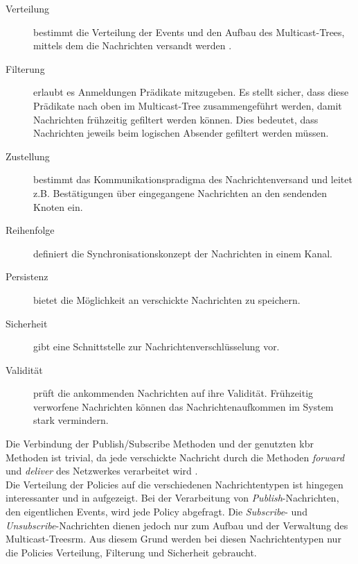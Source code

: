 \begin{description}
\item[Verteilung] bestimmt die Verteilung der Events und den Aufbau des Multicast-Trees, mittels dem die Nachrichten versandt werden \cite{KostasKatrinis2005}.
\item[Filterung] erlaubt es Anmeldungen Prädikate mitzugeben. Es stellt sicher, dass diese Prädikate nach oben im Multicast-Tree zusammengeführt werden, damit Nachrichten frühzeitig gefiltert werden können. Dies bedeutet, dass Nachrichten jeweils beim logischen Absender gefiltert werden müssen.
\item[Zustellung] bestimmt das Kommunikationspradigma des Nachrichtenversand und leitet z.B. Bestätigungen über eingegangene Nachrichten an den sendenden Knoten ein.
\item[Reihenfolge] definiert die Synchronisationskonzept der Nachrichten in einem Kanal.
\item[Persistenz] bietet die Möglichkeit an verschickte Nachrichten zu speichern.
\item[Sicherheit] gibt eine Schnittstelle zur Nachrichtenverschlüsselung vor.
\item[Validität] prüft die ankommenden Nachrichten auf ihre Validität. Frühzeitig verworfene Nachrichten können das Nachrichtenaufkommen im System stark vermindern.
\end{description}

Die Verbindung der Publish/Subscribe Methoden und der genutzten \ac{kbr} Methoden ist trivial, da jede verschickte Nachricht durch die Methoden \emph{forward} und \emph{deliver} des Netzwerkes verarbeitet wird \cite{Dabek2003Towards}.\\
Die Verteilung der Policies auf die verschiedenen Nachrichtentypen ist hingegen interessanter und in  aufgezeigt. Bei der Verarbeitung von \emph{Publish}-Nachrichten, den eigentlichen Events, wird jede Policy abgefragt. Die \emph{Subscribe}- und \emph{Unsubscribe}-Nachrichten dienen jedoch nur zum Aufbau und der Verwaltung des Multicast-Treesrm. Aus diesem Grund werden bei diesen Nachrichtentypen nur die Policies Verteilung, Filterung und Sicherheit gebraucht.

